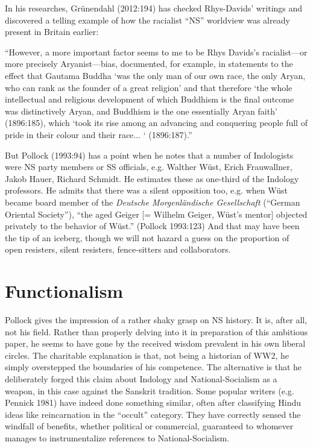 In his researches, Grünendahl (2012:194) has checked Rhys-Davids’ writings and discovered a telling example of how the racialist “NS” worldview was already present in Britain earlier:
\smallskip

\begin{myquote}
“However, a more important factor seems to me to be Rhys Davids’s racialist—or more precisely Aryanist—bias, documented, for example, in statements to the effect that Gautama Buddha ‘was the only man of our own race, the only Aryan, who can rank as the founder of a great religion’ and that therefore ‘the whole intellectual and religious development of which Buddhism is the final outcome was distinctively Aryan, and Buddhism is the one essentially Aryan faith’ (1896:185), which ‘took its rise among an advancing and conquering people full of pride in their colour and their race$\ldots$  ‘ (1896:187).”
\end{myquote}
\smallskip

But Pollock (1993:94) has a point when he notes that a number of Indologists were NS party members or SS officials, e.g. Walther Wüst, Erich Frauwallner, Jakob Hauer, Richard Schmidt. He estimates these as one-third of the Indology professors. He admits that there was a silent opposition too, e.g. when Wüst became board member of the {\sl Deutsche Morgenländische Gesellschaft} (“German Oriental Society”), “the aged Geiger [= Wilhelm Geiger, Wüst’s mentor] objected privately to the behavior of Wüst.” (Pollock 1993:123) And that may have been the tip of an iceberg, though we will not hazard a guess on the proportion of open resisters, silent resisters, fence-sitters and collaborators.

\section*{Functionalism}

Pollock gives the impression of a rather shaky grasp on NS history. It is, after all, not his field. Rather than properly delving into it in preparation of this ambitious paper, he seems to have gone by the received wisdom prevalent in his own liberal circles. The charitable explanation is that, not being a historian of WW2, he simply overstepped the boundaries of his competence. The alternative is that he deliberately forged this claim about Indology and National-Socialism as a weapon, in this case against the Sanskrit tradition. Some popular writers (e.g. Pennick 1981) have indeed done something similar, often after classifying Hindu ideas like reincarnation in the “occult” category. They have correctly sensed the windfall of benefits, whether political or commercial, guaranteed to whomever manages to instrumentalize references to National-Socialism.

